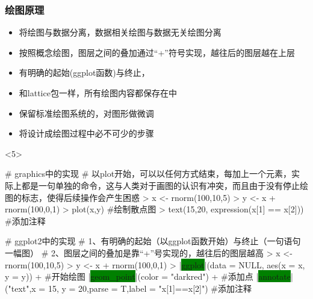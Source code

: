 \subsubsection{绘图原理}
\begin{frame}[t,fragile]{\subsecname}{\subsubsecname}
\begin{itemize}
\item<1-> 将绘图与数据分离，数据相关绘图与数据无关绘图分离
\item<2-> 按照概念绘图，图层之间的叠加通过“+”符号实现，越往后的图层越在上层
\item<2-> 有明确的起始(ggplot函数)与终止，
\item<3-> 和lattice包一样，所有绘图内容都保存在中
\item<4-> 保留标准绘图系统的，对图形做微调
\item<4-> 将设计成绘图过程中必不可少的步骤
\end{itemize}

\begin{overlayarea}{\textwidth}{\textheight}
\begin{onlyenv}<5>
\begin{minipage}{\textwidth}
\begin{rcode}
# graphics中的实现
# 以plot开始，可以以任何方式结束，每加上一个元素，实际上都是一句单独的命令，这与人类对于画图的认识有冲突，而且由于没有停止绘图的标志，使得后续操作会产生困惑
> x <- rnorm(100,10,5)
> y <- x + rnorm(100,0,1)
> plot(x,y)   #绘制散点图
> text(15,20, expression(x[1] == x[2])) #添加注释
\end{rcode} 
\end{minipage}

\begin{minipage}{\textwidth}
\begin{rcode}
# ggplot2中的实现
# 1、有明确的起始（以ggplot函数开始）与终止（一句语句一幅图）
# 2、图层之间的叠加是靠“+”号实现的，越往后的图层越高
> x <- rnorm(100,10,5) 
> y <- x + rnorm(100,0,1) 
> |\colorbox{green}{ggplot}|(data = NULL, aes(x = x, y = y)) +  #开始绘图
  |\colorbox{green}{geom\_point}|(color = "darkred") +  #添加点
  |\colorbox{green}{annotate}|("text",x = 15, y = 20,parse = T,label = "x[1]==x[2]") #添加注释
\end{rcode}
\end{minipage}
\end{onlyenv}
\end{overlayarea}
\end{frame}

